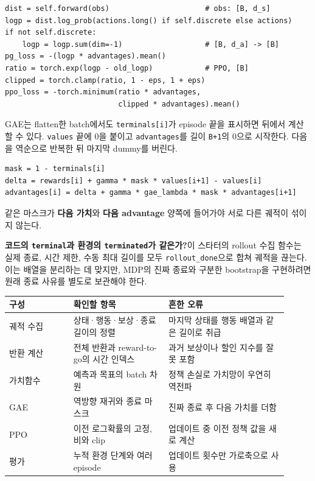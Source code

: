 \documentclass[11pt,a4paper]{article}
\begin{document}
\begin{verbatim}
dist = self.forward(obs)                      # obs: [B, d_s]
logp = dist.log_prob(actions.long() if self.discrete else actions)
if not self.discrete:
    logp = logp.sum(dim=-1)                   # [B, d_a] -> [B]
pg_loss = -(logp * advantages).mean()
ratio = torch.exp(logp - old_logp)            # PPO, [B]
clipped = torch.clamp(ratio, 1 - eps, 1 + eps)
ppo_loss = -torch.minimum(ratio * advantages,
                          clipped * advantages).mean()
\end{verbatim}

GAE는 flatten한 batch에서도 \texttt{terminals[i]}가 episode 끝을 표시하면 뒤에서 계산할 수 있다. \texttt{values} 끝에 0을 붙이고 \texttt{advantages}를 길이 \texttt{B+1}의 0으로 시작한다. 다음을 역순으로 반복한 뒤 마지막 dummy를 버린다.\par

\begin{verbatim}
mask = 1 - terminals[i]
delta = rewards[i] + gamma * mask * values[i+1] - values[i]
advantages[i] = delta + gamma * gae_lambda * mask * advantages[i+1]
\end{verbatim}

같은 마스크가 \textbf{다음 가치}와 \textbf{다음 advantage} 양쪽에 들어가야 서로 다른 궤적이 섞이지 않는다.\par

\par\medskip\noindent\textbf{코드의 \texttt{terminal}과 환경의 \texttt{terminated}가 같은가?}\quad 이 스타터의 rollout 수집 함수는 실제 종료, 시간 제한, 수동 최대 길이를 모두 \texttt{rollout\_\allowbreak{}done}으로 합쳐 궤적을 끊는다. 이는 배열을 분리하는 데 맞지만, MDP의 진짜 종료와 구분한 bootstrap을 구현하려면 원래 종료 사유를 별도로 보관해야 한다.\par

\begin{longtable}{p{0.21\linewidth}p{0.31\linewidth}p{0.39\linewidth}}\hline
구성 & 확인할 항목 & 흔한 오류 \\
\hline
궤적 수집 & 상태·행동·보상·종료 길이의 정렬 & 마지막 상태를 행동 배열과 같은 길이로 취급 \\
반환 계산 & 전체 반환과 reward-to-go의 시간 인덱스 & 과거 보상이나 할인 지수를 잘못 포함 \\
가치함수 & 예측과 목표의 batch 차원 & 정책 손실로 가치망이 우연히 역전파 \\
GAE & 역방향 재귀와 종료 마스크 & 진짜 종료 후 다음 가치를 더함 \\
PPO & 이전 로그확률의 고정, 비와 clip & 업데이트 중 이전 정책 값을 새로 계산 \\
평가 & 누적 환경 단계와 여러 episode & 업데이트 횟수만 가로축으로 사용 \\
\hline\end{longtable}
\end{document}
